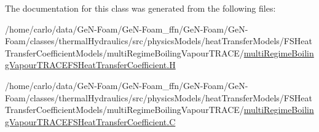 The documentation for this class was generated from the following files\+:\begin{DoxyCompactItemize}
\item 
/home/carlo/data/\+Ge\+N-\/\+Foam/\+Ge\+N-\/\+Foam\+\_\+ffn/\+Ge\+N-\/\+Foam/\+Ge\+N-\/\+Foam/classes/thermal\+Hydraulics/src/physics\+Models/heat\+Transfer\+Models/\+F\+S\+Heat\+Transfer\+Coefficient\+Models/multi\+Regime\+Boiling\+Vapour\+T\+R\+A\+C\+E/\hyperlink{multiRegimeBoilingVapourTRACEFSHeatTransferCoefficient_8H}{multi\+Regime\+Boiling\+Vapour\+T\+R\+A\+C\+E\+F\+S\+Heat\+Transfer\+Coefficient.\+H}\item 
/home/carlo/data/\+Ge\+N-\/\+Foam/\+Ge\+N-\/\+Foam\+\_\+ffn/\+Ge\+N-\/\+Foam/\+Ge\+N-\/\+Foam/classes/thermal\+Hydraulics/src/physics\+Models/heat\+Transfer\+Models/\+F\+S\+Heat\+Transfer\+Coefficient\+Models/multi\+Regime\+Boiling\+Vapour\+T\+R\+A\+C\+E/\hyperlink{multiRegimeBoilingVapourTRACEFSHeatTransferCoefficient_8C}{multi\+Regime\+Boiling\+Vapour\+T\+R\+A\+C\+E\+F\+S\+Heat\+Transfer\+Coefficient.\+C}\end{DoxyCompactItemize}
